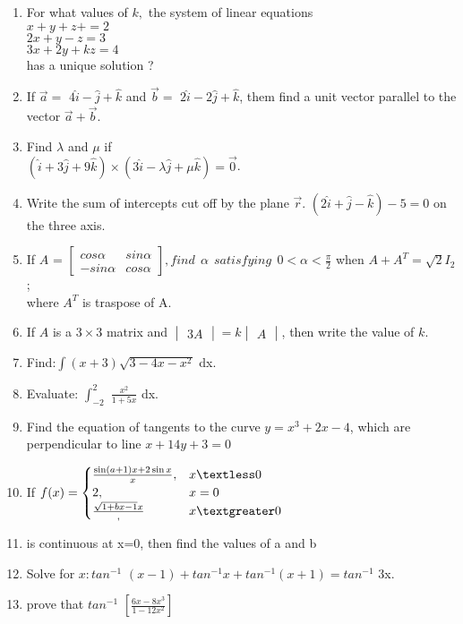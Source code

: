 \documentclass[12pt,-letter paper]{article}
\providecommand{\mydet}[1]{\ensuremath{\begin{vmatrix}#1\end{vmatrix}}}
\providecommand{\myvec}[1]{\ensuremath{\begin{bmatrix}#1\end{bmatrix}}}
\providecommand{\brak}[1]{\ensuremath{\left(#1\right)}}
\begin{document}
\begin{enumerate}
	\item  For what values of $ k, $ the system of linear equations \\
       $ x+y+z+=2 $ \\
       $ 2x+y-z=3 $ \\
       $ 3x+2y+kz=4 $ \\
       has a unique solution ?      
\item If $\overset{\rightarrow}{a}=$ $4\hat{i}-\hat{j}+\hat{k}$ and $\overset{\rightarrow}{b}=$ $2\hat{i}-2\hat{j}+\hat{k}$, them find a unit vector parallel to the vector $\overset{\rightarrow}{a}+\overset{\rightarrow}{b}.$
\item Find $\lambda$ and $\mu$ if \\
	$\brak{\hat{i}+3\hat{j}+9\hat{k}}\times\brak{3\hat{i}-\lambda\hat{j}+\mu\hat{k}}=\overset{\rightarrow}{0}$.
\item Write the sum of intercepts cut off by the plane $\overset{\rightarrow}{r}$. $\brak{2\hat{i}+\hat{j}-\hat{k}}-5=0$ on the three axis.
\item If $A$ = $\myvec{cos \alpha & sin \alpha \\ -sin \alpha & cos \alpha}, find\ \ \alpha\ \ satisfying\ \ 0< \alpha < \frac{\pi}{2}$ when $A+A^{T}=\sqrt{2}I_{2}$; \\ where $A^{T}$ is traspose of A.
\item If $A$ is a $3\times3$ matrix and $\mydet{3A}=k\mydet{A}$, then write the value of $k.$ 	
\item Find:$\int$\brak{x+3}$\sqrt{3-4x-x^2}$ dx.	
\item Evaluate: $\int_{-2}^{2}$ $\frac{x^2}{1+5x}$ dx.
\item Find the equation of tangents to the curve $y=x^3+2x-4$, which are perpendicular to line $x+14y+3=0 $
\item  If  $f(x)=
	\begin{cases}
		\frac{\sin\brak{a+1}x + 2\sin x}{x},& x\textless0 \\
		        2, &x = 0 \\
		\frac{\sqrt{1+bx-1}{x}}, & x\textgreater0
	\end{cases} $\\
\item is continuous at x=0, then find the values of a and b
\item Solve for $x:tan^{-1}$ $\brak{x-1}+tan^{-1}x+tan^{-1}\brak{x+1}=tan^{-1}$ 3x.
\item prove that $tan^{-1}$ $[\frac{6x-8x^3}{1-12x^2}]$

\end{enumerate}
\end{document}

